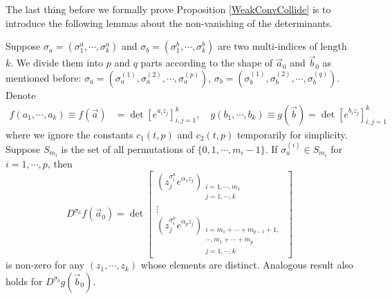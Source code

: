 The last thing before we formally prove Proposition \ref{WeakConvCollide} is to introduce the following lemmas about the non-vanishing of the determinants.

\begin{lemma}{\label{NonVanish}}
	Suppose $\sigma_{a}=(\sigma_{1}^{a},\cdots,\sigma_{k}^{a})$ and $\sigma_{b}=(\sigma_{1}^{b},\cdots,\sigma_{k}^{b})$ are two multi-indices of length $k$. We divide them into $p$ and $q$ parts according to the shape of $\vec{a}_{0}$ and $\vec{b}_{0}$ as mentioned before: $\sigma_{a}=(\sigma^{(1)}_{a},\sigma^{(2)}_{a},\cdots,\sigma^{(p)}_{a})$, $\sigma_{b}=(\sigma^{(1)}_{b},\sigma^{(2)}_{b},\cdots,\sigma^{(q)}_{b})$. Denote 
	\begin{align*}
	f(a_{1},\cdots,a_{k})\equiv f(\vec{a})&=\det[e^{a_{i}z_{j}}]_{i,j=1}^{k},\quad g(b_{1},\cdots,b_{k})\equiv g(\vec{b})=\det[e^{b_{i}z_{j}}]_{i,j=1}^{k}
\end{align*} where we ignore the constants $c_{1}(t,p)$ and $c_{2}(t,p)$ temporarily for simplicity. Suppose $S_{m_i}$ is the set of all permutations of $\{0,1,\cdots,m_{i}-1\}$. If $\sigma_{a}^{(i)}\in S_{m_i}$ for $i=1,\cdots,p$, then 
\[ D^{\sigma_{a}}f(\vec{a}_{0})= \det
	\left[ \begin{array}{ccc}
		(z_{j}^{\sigma_{i}^{a}}e^{\alpha_{1}z_{j}})_{\substack{i=1,\cdots,m_{1}\\j=1,\cdots,k}}\\
	\vdots\\
	(z_{j}^{\sigma_{i}^{a}}e^{\alpha_{p}z_{j}})_{\substack{i=m_1+\cdots+m_{p-1}+1,\\ \cdots ,m_{1}+\cdots +m_{p} \\j=1,\cdots,k}}
	\end{array}
	\right]
\]
is non-zero for any $(z_{1},\cdots,z_{k})$ whose elements are distinct. Analogous result also holds for $D^{\sigma_{b}}g(\vec{b}_{0})$.
\end{lemma}

